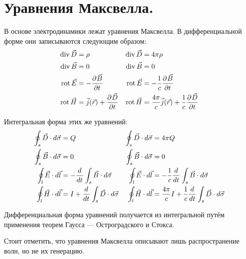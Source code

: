 
\section{Уравнения Максвелла.}
В основе электродинамики лежат уравнения Максвелла. В дифференциальной форме они записываются следующим образом:
\begin{align*}
	\operatorname*{div}{\vec{D}} &= \rho &
	\operatorname*{div}{\vec{D}} &= 4\pi\rho \\
	\operatorname*{div}{\vec{B}} &= 0 &
	\operatorname*{div}{\vec{B}} &= 0 \\
	\operatorname*{rot}{\vec{E}} &= -\frac{\partial^{} \vec{B}}{\partial t^{}} &
	\operatorname*{rot}{\vec{E}} &= -\frac{1}{c}\frac{\partial^{} \vec{B}}{\partial t^{}} \\
	\operatorname*{rot}{\vec{H}} &= \vec{j}(\vec{r}) + \frac{\partial^{} \vec{D}}{\partial t^{}} &
	\operatorname*{rot}{\vec{H}} &= \frac{4\pi}{c}\vec{j}(\vec{r}) + \frac{1}{c}\frac{\partial^{} \vec{D}}{\partial t^{}}
\end{align*}

Интегральная форма этих же уравнений:
\begin{align*}
	\oint_{s} \vec{D}\cdot d\vec{\sigma} &= Q &
	\oint_{s} \vec{D} \cdot d\vec{\sigma} &= 4\pi Q \\
	\oint_{s} \vec{B} \cdot d\vec{\sigma} &= 0 &
	\oint_{s} \vec{B} \cdot d\vec{\sigma} &= 0 \\
	\oint_{l} \vec{E} \cdot d\vec{l} &= -\frac{d^{} }{d t^{}}\int_s \vec{B}\cdot d\vec{\sigma} &
	\oint_{l} \vec{E} \cdot d\vec{l} &= -\frac{1}{c}\frac{d^{} }{d t^{}}\int_s \vec{B}\cdot d\vec{\sigma} \\
	\oint_{l} \vec{H} \cdot d\vec{l} &= I + \frac{d^{} }{d t^{}}\int_s \vec{D} \cdot d\vec{\sigma} &
	\oint_{l} \vec{H} \cdot d\vec{l} &= \frac{4\pi}{c}I + \frac{1}{c}\frac{d^{} }{d t^{}}\int_s \vec{D} \cdot d\vec{\sigma}
\end{align*}

Дифференциальная форма уравнений получается из интегральной путём применения теорем Гаусса --- Остроградского и Стокса.

Стоит отметить, что уравнения Максвелла описывают лишь распространение волн, но не их генерацию.

